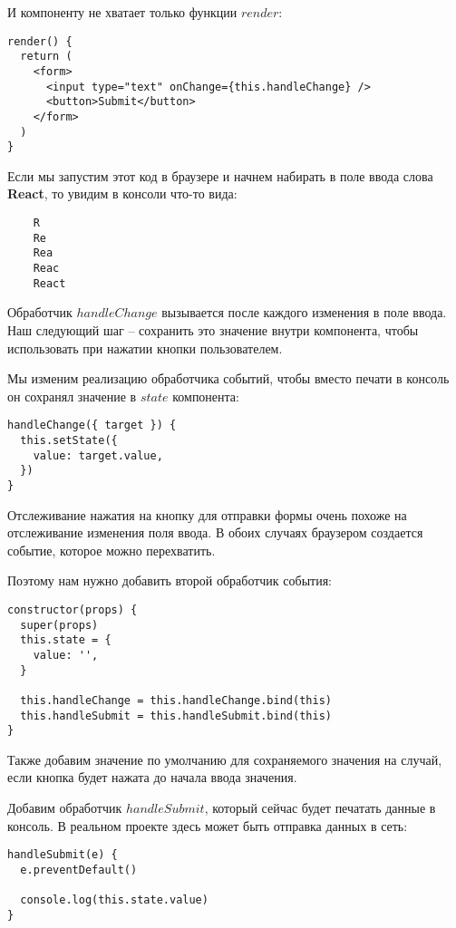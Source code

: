И компоненту не хватает только функции $render$:

\begin{lstlisting}
render() {
  return (
    <form>
      <input type="text" onChange={this.handleChange} />
      <button>Submit</button>
    </form>
  ) 
}
\end{lstlisting}

Если мы запустим этот код в браузере и начнем набирать в поле ввода слова \textbf{React}, то увидим в консоли что-то вида:

\begin{lstlisting}
    R
    Re
    Rea
    Reac
    React
\end{lstlisting}

Обработчик $handleChange$ вызывается после каждого изменения в поле ввода. Наш следующий шаг -- сохранить это значение внутри компонента, чтобы использовать при нажатии кнопки пользователем.

Мы изменим реализацию обработчика событий, чтобы вместо печати в консоль он сохранял значение в $state$ компонента:

\begin{lstlisting}
handleChange({ target }) {
  this.setState({
    value: target.value,
  })
}
\end{lstlisting}

Отслеживание нажатия на кнопку для отправки формы очень похоже на отслеживание изменения поля ввода. В обоих случаях браузером создается событие, которое можно перехватить.

Поэтому нам нужно добавить второй обработчик события:

\begin{lstlisting}
constructor(props) {
  super(props)
  this.state = {
    value: '',
  }
  
  this.handleChange = this.handleChange.bind(this)
  this.handleSubmit = this.handleSubmit.bind(this)
}
\end{lstlisting}

Также добавим значение по умолчанию для сохраняемого значения на случай, если кнопка будет нажата до начала ввода значения.

Добавим обработчик $handleSubmit$, который сейчас будет печатать данные в консоль. В реальном проекте здесь может быть отправка данных в сеть:

\begin{lstlisting}
handleSubmit(e) {
  e.preventDefault()
  
  console.log(this.state.value)
}
\end{lstlisting}

